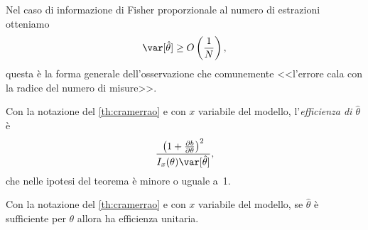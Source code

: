 Nel caso di informazione di Fisher proporzionale al numero di estrazioni otteniamo
\begin{equation*}
	\var[\hat\theta] \ge O \left(\frac1N\right),
\end{equation*}
questa è la forma generale dell'osservazione che comunemente
<<l'errore cala con la radice del numero di misure>>.

\begin{definition}[Efficienza]
	Con la notazione del \autoref{th:cramerrao} e con $x$ variabile del modello,
	l'\emph{efficienza di $\hat\theta$} è
	\begin{equation*}
		\frac{\left( 1 + \frac{\partial b}{\partial\theta} \right)^2}{I_x(\theta)\var[\hat\theta]},
	\end{equation*}
	che nelle ipotesi del teorema è minore o uguale a~1.
\end{definition}

\begin{theorem}
	\label{th:suffeff}
	Con la notazione del \autoref{th:cramerrao} e con $x$ variabile del modello,
	se $\hat\theta$ è sufficiente per $\theta$ allora ha efficienza unitaria.
\end{theorem}

